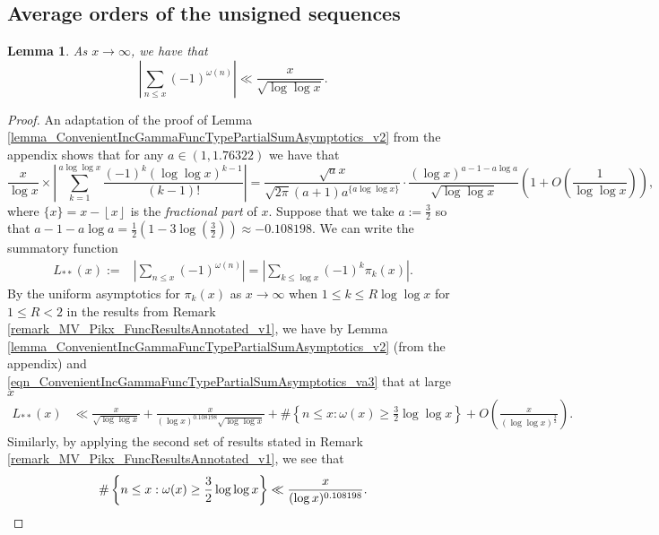 \documentclass[11pt,reqno,a4letter]{article}
\numberwithin{figure}{section}
\numberwithin{table}{section}
\newcommand{\floor}[1]{\left\lfloor #1 \right\rfloor}
\theoremstyle{plain}
\newtheorem{lemma}[theorem]{Lemma}
\numberwithin{theorem}{section}
\theoremstyle{definition}
\begin{document}
\subsection{Average orders of the unsigned sequences}
\label{subSection_AvgOrdersOfTheUnsignedSequences} 

\begin{lemma} 
\label{cor_AsymptoticsForSignedSumsOfomegan_v1}
As $x \rightarrow \infty$, we have that 
\[
\left\lvert \sum_{n \leq x} (-1)^{\omega(n)} \right\rvert \ll 
     \frac{x}{\sqrt{\log\log x}}. 
\]
\end{lemma}
\begin{proof}
An adaptation of the proof of Lemma \ref{lemma_ConvenientIncGammaFuncTypePartialSumAsymptotics_v2} 
     from the appendix shows that for any $a \in (1, 1.76322)$ we have that 
\begin{equation}
\label{eqn_ConvenientIncGammaFuncTypePartialSumAsymptotics_va3} 
\frac{x}{\log x} \times \left\lvert \sum_{k=1}^{a\log\log x} \frac{(-1)^{k} (\log\log x)^{k-1}}{(k-1)!} 
     \right\rvert = \frac{\sqrt{a} x}{\sqrt{2\pi}(a+1) a^{\{a\log\log x\}}} 
     \cdot \frac{(\log x)^{a-1-a\log a}}{\sqrt{\log\log x}} 
     \left(1 + O\left(\frac{1}{\log\log x}\right)\right), 
\end{equation}
where $\{x\} = x - \floor{x}$ is the \emph{fractional part} of $x$. 
Suppose that we take $a := \frac{3}{2}$ so that 
$a-1-a\log a = \frac{1}{2}\left(1-3\log\left(\frac{3}{2}\right)\right) \approx -0.108198$. 
We can write the summatory function 
\begin{align*}
L_{\ast\ast}(x) := & \left\lvert \sum_{n \leq x} (-1)^{\omega(n)} \right\rvert = 
     \left\lvert \sum_{k \leq \log x} (-1)^{k} \pi_k(x) \right\rvert. 
\end{align*} 
By the uniform asymptotics for $\pi_k(x)$ as $x \rightarrow \infty$ when $1 \leq k \leq R \log\log x$ for 
$1 \leq R < 2$ in the results from 
Remark \ref{remark_MV_Pikx_FuncResultsAnnotated_v1}, 
we have by Lemma \ref{lemma_ConvenientIncGammaFuncTypePartialSumAsymptotics_v2} 
(from the appendix) and 
\eqref{eqn_ConvenientIncGammaFuncTypePartialSumAsymptotics_va3} that at large $x$ 
\begin{align*}
L_{\ast\ast}(x) & \ll \frac{x}{\sqrt{\log\log x}} + 
     \frac{x}{(\log x)^{0.108198} \sqrt{\log\log x}} + 
     \#\left\{n \leq x: \omega(x) \geq \frac{3}{2}\log\log x\right\} + O\left(
     \frac{x}{(\log\log x)^{\frac{3}{2}}}\right). 
\end{align*} 
Similarly, by applying the second set of results stated in 
Remark \ref{remark_MV_Pikx_FuncResultsAnnotated_v1}, we see that 
\[
\#\left\{n \leq x: \omega(x) \geq \frac{3}{2}\log\log x\right\} \ll 
     \frac{x}{(\log x)^{0.108198}}. 
     \qedhere 
\]
\end{proof}
\end{document}
